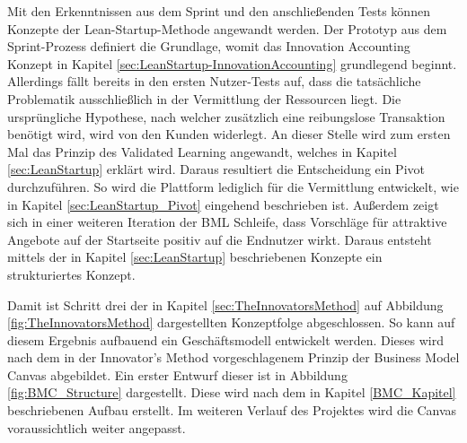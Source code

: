 Mit den Erkenntnissen aus dem Sprint und den anschließenden Tests können Konzepte der Lean-Startup-Methode angewandt werden. Der Prototyp aus dem Sprint-Prozess definiert die Grundlage, womit das Innovation Accounting Konzept in Kapitel \ref{sec:LeanStartup-InnovationAccounting} grundlegend beginnt. Allerdings fällt bereits in den ersten Nutzer-Tests auf, dass die tatsächliche Problematik ausschließlich in der Vermittlung der Ressourcen liegt. Die ursprüngliche Hypothese, nach welcher zusätzlich eine reibungslose Transaktion benötigt wird, wird von den Kunden widerlegt. An dieser Stelle wird zum ersten Mal das Prinzip des Validated Learning angewandt, welches in Kapitel \ref{sec:LeanStartup} erklärt wird. Daraus resultiert die Entscheidung ein Pivot durchzuführen. So wird die Plattform lediglich für die Vermittlung entwickelt, wie in Kapitel \ref{sec:LeanStartup_Pivot} eingehend beschrieben ist. Außerdem zeigt sich in einer weiteren Iteration der \ac{BML} Schleife, dass Vorschläge für attraktive Angebote auf der Startseite positiv auf die Endnutzer wirkt. Daraus entsteht mittels der in Kapitel \ref{sec:LeanStartup} beschriebenen Konzepte ein strukturiertes Konzept. 

Damit ist Schritt drei der in Kapitel \ref{sec:TheInnovatorsMethod} auf Abbildung \ref{fig:TheInnovatorsMethod} dargestellten Konzeptfolge abgeschlossen. So kann auf diesem Ergebnis aufbauend ein Geschäftsmodell entwickelt werden. Dieses wird nach dem in der Innovator's Method vorgeschlagenem Prinzip der Business Model Canvas abgebildet. Ein erster Entwurf dieser ist in Abbildung \ref{fig:BMC_Structure} dargestellt. Diese wird nach dem in Kapitel \ref{BMC_Kapitel} beschriebenen Aufbau erstellt. Im weiteren Verlauf des Projektes wird die Canvas voraussichtlich weiter angepasst.

